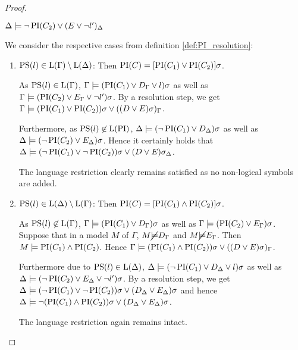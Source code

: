 \begin{proof}
\begin{itemize}
	$\Delta \models \lnot \operatorname{PI}(C_2) \lor (E\lor \lnot l')_\Delta$

		We consider the respective cases from definition \ref{def:PI_resolution}:

			\begin{enumerate}
				\item $\operatorname{PS}(l) \in \operatorname{L}(\Gamma) \setminus \operatorname{L}(\Delta)$:
					\label{huang_proof_prop_case_1}
					Then $\operatorname{PI}(C) = [\operatorname{PI}(C_1) \lor \operatorname{PI}(C_2)]\sigma$. 

					As $\operatorname{PS}(l) \in \operatorname{L}(\Gamma)$,
					$\Gamma \models (\operatorname{PI}(C_1) \lor D_\Gamma\lor l)\sigma$
					as well as $\Gamma \models (\operatorname{PI}(C_2) \lor E_\Gamma\lor \lnot l')\sigma$.
					By a resolution step, we get $\Gamma \models (\operatorname{PI}(C_1) \lor \operatorname{PI}(C_2))\sigma \lor ((D \lor E)\sigma)_\Gamma$.

					Furthermore, as $\operatorname{PS}(l) \not\in \operatorname{L}(\operatorname{PI})$, 
					$\Delta \models (\lnot\operatorname{PI}(C_1) \lor D_\Delta)\sigma$
					as well as $\Delta \models (\lnot\operatorname{PI}(C_2) \lor E_\Delta)\sigma$.
					Hence it certainly holds that $\Delta \models (\lnot \operatorname{PI}(C_1) \lor \lnot\operatorname{PI}(C_2))\sigma \lor (D \lor E)\sigma_\Delta$.

					The language restriction clearly remains satisfied as no non-logical symbols are added.

				\item $\operatorname{PS}(l) \in \operatorname{L}(\Delta) \setminus \operatorname{L}(\Gamma)$: 
					\label{huang_proof_prop_case_2}
					Then $\operatorname{PI}(C) = [\operatorname{PI}(C_1) \land \operatorname{PI}(C_2)]\sigma$. 

					As $\operatorname{PS}(l) \not\in \operatorname{L}(\Gamma)$,
					$\Gamma \models (\operatorname{PI}(C_1) \lor D_\Gamma)\sigma$
					as well as $\Gamma \models (\operatorname{PI}(C_2) \lor E_\Gamma)\sigma$.
					Suppose that in a model $M$ of $\Gamma$, $M \cancel {\models} D_\Gamma$ and $M \cancel {\models} E_\Gamma$. Then $M \models \operatorname{PI}(C_1) \land \operatorname{PI}(C_2)$.
					Hence 
					$\Gamma \models (\operatorname{PI}(C_1) \land \operatorname{PI}(C_2))\sigma \lor ((D \lor E)\sigma)_\Gamma$.

					Furthermore due to $\operatorname{PS}(l) \in \operatorname{L}(\Delta)$,
					$\Delta \models (\lnot\operatorname{PI}(C_1) \lor D_\Delta \lor l)\sigma$
					as well as $\Delta \models (\lnot\operatorname{PI}(C_2) \lor E_\Delta \lor \lnot l')\sigma$.
					By a resolution step, we get $\Delta \models (\lnot\operatorname{PI}(C_1) \lor \lnot\operatorname{PI}(C_2))\sigma \lor (D_\Delta \lor E_\Delta)\sigma $
					and hence 
					$\Delta \models \lnot (\operatorname{PI}(C_1) \land \operatorname{PI}(C_2))\sigma \lor (D_\Delta \lor E_\Delta)\sigma $.

					The language restriction again remains intact.


\end{enumerate}
\end{itemize}
\end{proof}
